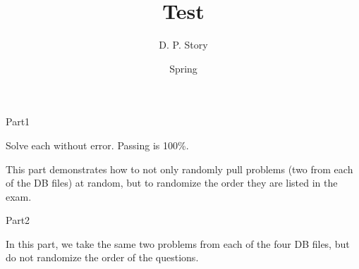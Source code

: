\documentclass{article}
\title[T\nExam]{Test \nExam}
\author{D. P. Story}
\date{Spring \the\year}
\begin{document}
\maketitle

\begin{exam}{Part1}

\begin{instructions}
Solve each without error. Passing is 100\%.

\medskip\noindent
This part demonstrates how to not only randomly pull problems (two from each of the DB files) at random, but
to randomize the order they are listed in the exam.
\end{instructions}


\end{exam}

\begin{exam}{Part2}

\begin{instructions}
In this part, we take the same two problems from each of the four DB files, but do not randomize
the order of the questions.
\end{instructions}


\end{exam}
\end{document}
